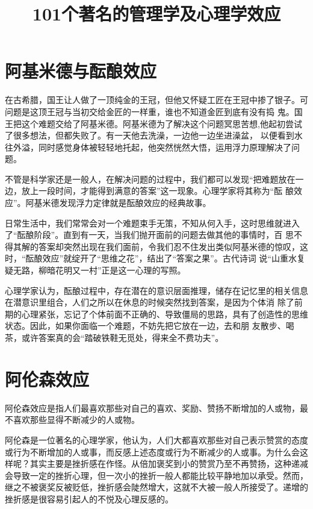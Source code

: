 \documentclass[11pt]{ctexart}
\title{101个著名的管理学及心理学效应}
\begin{document}
\maketitle

\setcounter{tocdepth}{3}
\tableofcontents

\vspace*{1cm}
\section{阿基米德与酝酿效应}
\label{sec-1}


在古希腊，国王让人做了一顶纯金的王冠，但他又怀疑工匠在王冠中掺了银子。可问题是这顶王冠与当初交给金匠的一样重，谁也不知道金匠到底有没有捣
鬼。国王把这个难题交给了阿基米德。阿基米德为了解决这个问题冥思苦想,他起初尝试了很多想法，但都失败了。有一天他去洗澡，一边他一边坐进澡盆，
以便看到水往外溢，同时感觉身体被轻轻地托起，他突然恍然大悟，运用浮力原理解决了问题。

不管是科学家还是一般人，在解决问题的过程中，我们都可以发现“把难题放在一边，放上一段时间，才能得到满意的答案”这一现象。心理学家将其称为“酝
酿效应”。阿基米德发现浮力定律就是酝酿效应的经典故事。

日常生活中，我们常常会对一个难题束手无策，不知从何入手，这时思维就进入了“酝酿阶段”。直到有一天，当我们抛开面前的问题去做其他的事情时，百
思不得其解的答案却突然出现在我们面前，令我们忍不住发出类似阿基米德的惊叹，这时，“酝酿效应”就绽开了“思维之花”，结出了“答案之果”。古代诗词
说“山重水复疑无路，柳暗花明又一村”正是这一心理的写照。

心理学家认为，酝酿过程中，存在潜在的意识层面推理，储存在记忆里的相关信息在潜意识里组合，人们之所以在休息的时候突然找到答案，是因为个体消
除了前期的心理紧张，忘记了个体前面不正确的、导致僵局的思路，具有了创造性的思维状态。因此，如果你面临一个难题，不妨先把它放在一边，去和朋
友散步、喝茶，或许答案真的会“踏破铁鞋无觅处，得来全不费功夫”。
\section{阿伦森效应}
\label{sec-2}


阿伦森效应是指人们最喜欢那些对自己的喜欢、奖励、赞扬不断增加的人或物，最不喜欢那些显得不断减少的人或物。

阿伦森是一位著名的心理学家，他认为，人们大都喜欢那些对自己表示赞赏的态度或行为不断增加的人或事，而反感上述态度或行为不断减少的人或事。为什么会这样呢？其实主要是挫折感在作怪。从倍加褒奖到小的赞赏乃至不再赞扬，这种递减会导致一定的挫折心理，但一次小的挫折一般人都能比较平静地加以承受。然而，继之不被褒奖反被贬低，挫折感会陡然增大，这就不大被一般人所接受了。递增的挫折感是很容易引起人的不悦及心理反感的。
\end{document}
